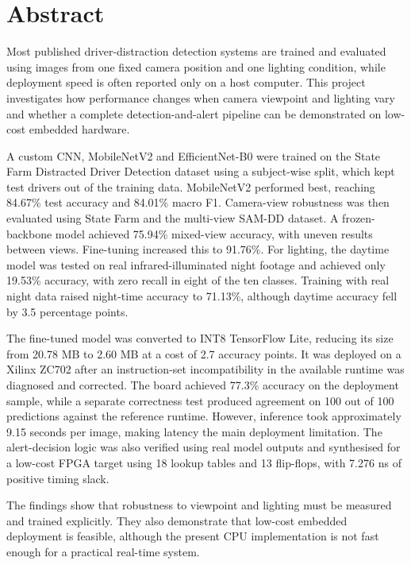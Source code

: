 \chapter*{Abstract}

Most published driver-distraction detection systems are trained and evaluated using images from one fixed camera position and one lighting condition, while deployment speed is often reported only on a host computer. This project investigates how performance changes when camera viewpoint and lighting vary and whether a complete detection-and-alert pipeline can be demonstrated on low-cost embedded hardware.

A custom CNN, MobileNetV2 and EfficientNet-B0 were trained on the State Farm Distracted Driver Detection dataset using a subject-wise split, which kept test drivers out of the training data. MobileNetV2 performed best, reaching 84.67\% test accuracy and 84.01\% macro F1. Camera-view robustness was then evaluated using State Farm and the multi-view SAM-DD dataset. A frozen-backbone model achieved 75.94\% mixed-view accuracy, with uneven results between views. Fine-tuning increased this to 91.76\%. For lighting, the daytime model was tested on real infrared-illuminated night footage and achieved only 19.53\% accuracy, with zero recall in eight of the ten classes. Training with real night data raised night-time accuracy to 71.13\%, although daytime accuracy fell by 3.5 percentage points.

The fine-tuned model was converted to INT8 TensorFlow Lite, reducing its size from 20.78 MB to 2.60 MB at a cost of 2.7 accuracy points. It was deployed on a Xilinx ZC702 after an instruction-set incompatibility in the available runtime was diagnosed and corrected. The board achieved 77.3\% accuracy on the deployment sample, while a separate correctness test produced agreement on 100 out of 100 predictions against the reference runtime. However, inference took approximately 9.15 seconds per image, making latency the main deployment limitation. The alert-decision logic was also verified using real model outputs and synthesised for a low-cost FPGA target using 18 lookup tables and 13 flip-flops, with 7.276 ns of positive timing slack.

The findings show that robustness to viewpoint and lighting must be measured and trained explicitly. They also demonstrate that low-cost embedded deployment is feasible, although the present CPU implementation is not fast enough for a practical real-time system.